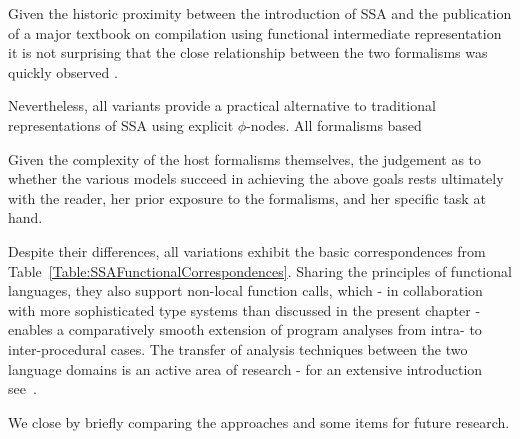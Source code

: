 Given the historic proximity between the introduction of SSA and the
publication of a major textbook on compilation using functional
intermediate representation it is not surprising that the close
relationship between the two formalisms was quickly observed
\cite{Kelsey95}.

 Nevertheless,
all variants provide a practical alternative to traditional
representations of SSA using explicit $\phi$-nodes. All formalisms
based 


 Given the complexity of the host formalisms
themselves, the judgement as to whether the various models succeed in
achieving the above goals rests ultimately with the reader, her prior
exposure to the formalisms, and her specific task at hand.

Despite their
differences, all variations exhibit the basic correspondences from
Table~\ref{Table:SSAFunctionalCorrespondences}. Sharing the principles
of functional languages, they also support non-local function calls,
which - in collaboration with more sophisticated type systems than
discussed in the present chapter - enables a comparatively smooth
extension of program analyses from intra- to inter-procedural
cases. The transfer of analysis techniques between the two language
domains is an active area of research - for an extensive introduction
see~\cite{NielsenNielsenHankin}.

We close by briefly comparing the approaches and some items for future
research.

